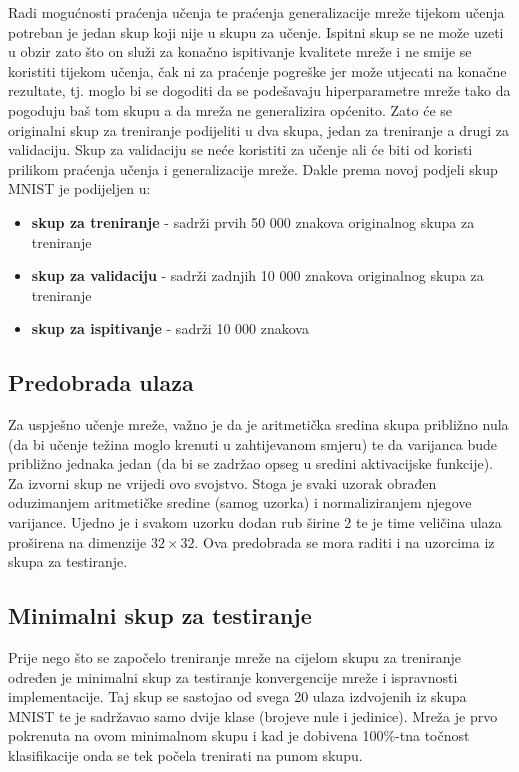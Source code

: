 \documentclass[times, utf8, zavrsni, numeric]{fer}
\begin{document}
Radi mogućnosti praćenja učenja te praćenja generalizacije mreže tijekom učenja potreban je jedan skup koji nije u skupu za učenje. Ispitni skup se ne može uzeti u obzir zato što on služi za konačno ispitivanje kvalitete mreže i ne smije se koristiti tijekom učenja, čak ni za praćenje pogreške jer može utjecati na konačne rezultate, tj. moglo bi se dogoditi da se podešavaju hiperparametre mreže tako da pogoduju baš tom skupu a da mreža ne generalizira općenito. Zato će se originalni skup za treniranje podijeliti u dva skupa, jedan za treniranje a drugi za validaciju. Skup za validaciju se neće koristiti za učenje ali će biti od koristi prilikom praćenja učenja i generalizacije mreže. Dakle prema novoj podjeli skup MNIST je podijeljen u:
\begin{itemize}
\item \textbf{skup za treniranje} - sadrži prvih 50 000 znakova originalnog skupa za treniranje
\item \textbf{skup za validaciju} - sadrži zadnjih 10 000 znakova originalnog skupa za treniranje
\item \textbf{skup za ispitivanje} - sadrži 10 000 znakova
\end{itemize}

\subsection{Predobrada ulaza}
Za uspješno učenje mreže, važno je da je aritmetička sredina skupa približno nula (da
bi učenje težina moglo krenuti u zahtijevanom smjeru) te da varijanca bude
približno jednaka jedan (da bi se zadržao opseg u sredini aktivacijske funkcije).
Za izvorni skup ne vrijedi ovo svojstvo. Stoga je svaki uzorak obrađen oduzimanjem 
aritmetičke sredine (samog uzorka) i normaliziranjem njegove varijance. Ujedno je i svakom uzorku dodan rub širine 2 te je time veličina ulaza proširena na dimenzije $32 \times 32$. Ova predobrada se mora raditi i na uzorcima iz skupa za testiranje.

\subsection{Minimalni skup za testiranje}
Prije nego što se započelo treniranje mreže na cijelom skupu za treniranje određen je minimalni skup za testiranje konvergencije mreže i ispravnosti implementacije. Taj skup se sastojao od svega 20 ulaza izdvojenih iz skupa MNIST te je sadržavao samo dvije klase (brojeve nule i jedinice). Mreža je prvo pokrenuta na ovom minimalnom skupu i kad je dobivena 100\%-tna točnost klasifikacije onda se tek počela trenirati na punom skupu.
\end{document}
